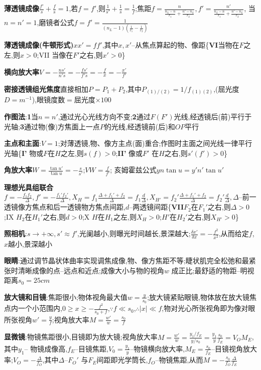 \documentclass[10pt,a4paper]{article}
\begin{document}
\textbf{薄透镜成像}$\frac{f'}{s}+\frac{f}{s}=1$,若$f=f'$,则$\frac{1}{s'}+\frac{1}{s}=\frac{1}{f}$;焦距$f=\frac{n}{\frac{n_L-n}{r_1}+\frac{n'-n_L}{r_2}},f'=\frac{n'}{\frac{n_L-n}{r_1}+\frac{n'-n_L}{r_2}}$, 当$n=n'=1$,磨镜者公式$f=f'=\frac{1}{(n_L-1)(\frac{1}{r_1}-\frac{1}{r_2})}$

\textbf{薄透镜成像(牛顿形式)}$xx'=ff'$,其中$x,x'$--从焦点算起的物、像距\{\textbf{VI}当物在$F$之左,则$x>0$;VII 当像在$F'$之右,则$x'>0$\}

\textbf{横向放大率}$V=-\frac{ns'}{n's}=-\frac{fs'}{f's}=-\frac{f}{x}=-\frac{x'}{f'}$

\textbf{密接透镜组光焦度}直接相加$P=P_1+P_2$,其中$P_{(1)/(2)}=1/f_{(1)(2)}$,(屈光度$D=m^{-1}$),眼镜度数$=$屈光度$\times100$

\textbf{作图法}:\textbf{1}当$n=n'$,通过光心光线方向不变;\textbf{2}通过$F(F')$光线,经透镜后(前)平行于光轴;\textbf{3}通过物(像)方焦面上一点$P$的光线,经透镜前(后)和$OP$平行

\textbf{主点和主面}:$V=1$;对薄透镜,物、像方主点(面)重合;作图时主面之间光线一律平行光轴\{\textbf{I'} 物或$F$在$H$之左,则$s(f)>0$;\textbf{II'} 像或$F'$ 在$H$之右,则$s'(f')>0$\}

\textbf{角放大率}$W=\frac{\tan u'}{\tan u}=-\frac{s}{s'}$;$VW=\frac{f}{f'}$; 亥姆霍兹公式$yn\tan u=y'n'\tan u'$

\textbf{理想光具组联合}$f=-\frac{f_1f_2}{\Delta},f'=-\frac{f_1'f_2'}{\Delta},X_H=f_1\frac{\Delta+f_1'+f_2}{\Delta}=f_1\frac{d}{\Delta},X_{H'}=f_2'\frac{\Delta+f_1'+f_2}{\Delta}=f_2'\frac{d}{\Delta}, \Delta$--前一透镜像方焦点和后一透镜物方焦点间距,$d$--两透镜间距\{\textbf{VII}$F_2$在$F_1'$之右,则$\Delta>0$;IX $H_2$在$H_1'$之右,则$d>0$;X $H$在$H_1$之左,则$X_H>0$;$H'$在$H_2'$之右,则$X_{H'}>0$\}

\textbf{照相机}:$s\to+\infty,s'\approx f'$,光阑越小,则曝光时间越长,景深越大;$\frac{\delta x'}{\delta x}=-\frac{f^2}{x^2}$,从而给定$f$,$x$越小,景深越小

\textbf{眼睛}:通过调节晶状体曲率实现调焦成像,物、像方焦距不等;睫状肌完全松弛和最紧张时清晰成像的点--远点和近点;成像大小与物的视角$w$ 成正比;最舒适的物距--明视距离$s_0=25cm$

\textbf{放大镜和目镜}:焦距很小;物体视角最大值$w=\frac{y}{s_0}$;放大镜紧贴眼镜,物体放在放大镜焦点内一个小范围内,$0\geq x\geq-\frac{f^2}{s_0+f}$,$\because f\ll s_0$,$\therefore|x|\ll f$,物对光心所张视角即为像对眼所张视角$w'=\frac{y}{f}$;视角放大率$M=\frac{w'}{w}=\frac{s_0}{f}$

\textbf{显微镜}:物镜焦距很小,目镜即为放大镜;视角放大率$M=\frac{w'}{w}=\frac{y_1/f_E}{y/s_0}=\frac{y_1}{y}\frac{s_0}{f_E}=V_OM_E$, 其中$y_1$-- 物镜成像高,$f_E$--目镜焦距,$V_0=\frac{y_1}{y}$--物镜横向放大率,$M_E=\frac{s_0}{f_E}$--目镜视角放大率;$V_O=-\frac{\Delta}{f_O}$,其中$\Delta$--$F_O'$ 与$F_E$间距即光学筒长,$f_O$--物镜焦距,从而$M=-\frac{s_0}{f_O}\frac{\Delta}{f_E}$
\end{document}
